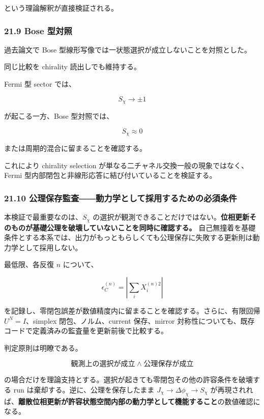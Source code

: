 \documentclass[
  a4paper,
]{ltjsarticle}
\begin{document}
という理論解釈が直接検証される。

\subsubsection{21.9 Bose 型対照}\label{bose-ux578bux5bfeux7167}

過去論文で Bose 型線形写像では一状態選択が成立しないことを対照とした。

同じ比較を chirality 読出しでも維持する。

Fermi 型 sector では、

\[
S_\chi\to\pm1
\]

が起こる一方、Bose 型対照では、

\[
S_\chi\approx0
\]

または周期的混合に留まることを確認する。

これにより chirality selection
が単なる二チャネル交換一般の現象ではなく、Fermi
型内部閉包と非線形応答に結び付いていることを検証する。

\subsubsection{21.10
公理保存監査――動力学として採用するための必須条件}\label{ux516cux7406ux4fddux5b58ux76e3ux67fbux52d5ux529bux5b66ux3068ux3057ux3066ux63a1ux7528ux3059ux308bux305fux3081ux306eux5fc5ux9808ux6761ux4ef6}

本検証で最重要なのは、\(S_\chi\)
の選択が観測できることだけではない。\textbf{位相更新そのものが基礎公理を破壊していないことを同時に確認する。}
自己無撞着を基礎条件とする本系では、出力がもっともらしくても公理保存に失敗する更新則は動力学として採用しない。

最低限、各反復 \(n\) について、

\[
\epsilon_C^{(n)}
=
\left|\sum_i X_i^{(n)2}\right|
\]

を記録し、零閉包誤差が数値精度内に留まることを確認する。さらに、有限回帰
\(U^N=I\)、simplex 閉包、ノルム、current 保存、mirror
対称性についても、既存コードで定義済みの監査量を更新前後で比較する。

判定原則は明瞭である。

\[
\boxed{
\text{観測上の選択が成立}
\;\land\;
\text{公理保存が成立}
}
\]

の場合だけを理論支持とする。選択が起きても零閉包その他の許容条件を破壊する
run は棄却する。逆に、公理を保存したまま
\(J_\chi\to\Delta\phi_\chi\to S_\chi\)
が再現されれば、\textbf{離散位相更新が許容状態空間内部の動力学として機能すること}の数値確認になる。
\end{document}
